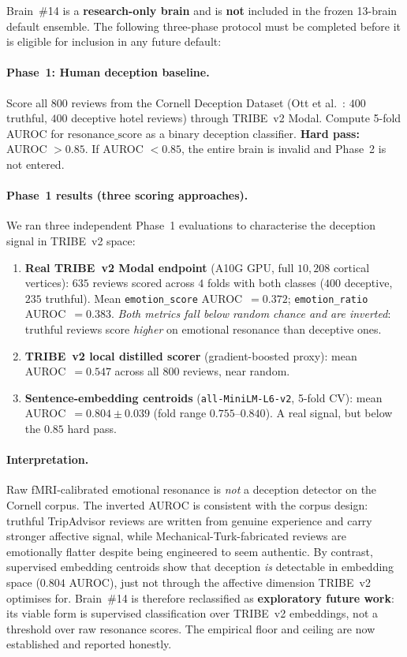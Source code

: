 \documentclass{article}
\begin{document}
Brain~\#14 is a \textbf{research-only brain} and is \textbf{not}
included in the frozen 13-brain default ensemble. The following
three-phase protocol must be completed before it is eligible for
inclusion in any future default:

\paragraph{Phase~1: Human deception baseline.}
Score all $800$ reviews from the Cornell Deception Dataset
(Ott et al.~\cite{ott2011finding}: $400$ truthful, $400$ deceptive
hotel reviews) through TRIBE~v2 Modal. Compute 5-fold AUROC for
$\mathrm{resonance\_score}$ as a binary deception classifier.
\textbf{Hard pass:} AUROC $> 0.85$. If AUROC $< 0.85$, the entire
brain is invalid and Phase~2 is not entered.

\paragraph{Phase~1 results (three scoring approaches).}
We ran three independent Phase~1 evaluations to characterise the
deception signal in TRIBE~v2 space:

\begin{enumerate}
\item \textbf{Real TRIBE~v2 Modal endpoint} (A10G GPU, full $10{,}208$
  cortical vertices): $635$ reviews scored across $4$ folds with both
  classes ($400$ deceptive, $235$ truthful). Mean
  \texttt{emotion\_score} AUROC~$= 0.372$; \texttt{emotion\_ratio}
  AUROC~$= 0.383$. \emph{Both metrics fall below random chance and are
  inverted}: truthful reviews score \emph{higher} on emotional
  resonance than deceptive ones.
\item \textbf{TRIBE~v2 local distilled scorer} (gradient-boosted
  proxy): mean AUROC~$= 0.547$ across all $800$ reviews, near random.
\item \textbf{Sentence-embedding centroids} (\texttt{all-MiniLM-L6-v2},
  5-fold CV): mean AUROC~$= 0.804 \pm 0.039$ (fold range
  $0.755$--$0.840$). A real signal, but below the $0.85$ hard pass.
\end{enumerate}

\paragraph{Interpretation.}
Raw fMRI-calibrated emotional resonance is \emph{not} a deception
detector on the Cornell corpus. The inverted AUROC is consistent with
the corpus design: truthful TripAdvisor reviews are written from
genuine experience and carry stronger affective signal, while
Mechanical-Turk-fabricated reviews are emotionally flatter despite
being engineered to seem authentic. By contrast, supervised embedding
centroids show that deception \emph{is} detectable in embedding space
($0.804$ AUROC), just not through the affective dimension TRIBE~v2
optimises for. Brain~\#14 is therefore reclassified as
\textbf{exploratory future work}: its viable form is supervised
classification over TRIBE~v2 embeddings, not a threshold over raw
resonance scores. The empirical floor and ceiling are now established
and reported honestly.
\end{document}
